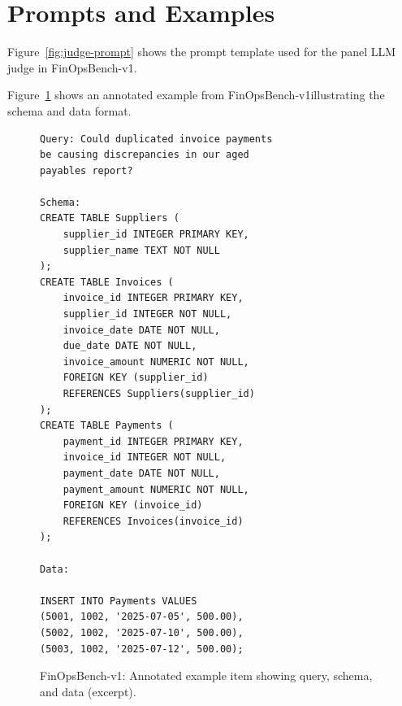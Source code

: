 \documentclass[11pt]{article}
\newcommand{\synthsubset}{FinOpsBench-v1}\xspace
\begin{document}
\section{Prompts and Examples}
\label{app:prompts}

Figure~\ref{fig:judge-prompt} shows the prompt template used for the 
panel
LLM judge in \synthsubset.

Figure~\ref{fig:example-item} shows an annotated example from \synthsubset illustrating the schema and data format.

\begin{figure}[h]
\small\centering
\begin{verbatim}
Query: Could duplicated invoice payments 
be causing discrepancies in our aged 
payables report?

Schema:
CREATE TABLE Suppliers (
    supplier_id INTEGER PRIMARY KEY,
    supplier_name TEXT NOT NULL
);
CREATE TABLE Invoices (
    invoice_id INTEGER PRIMARY KEY,
    supplier_id INTEGER NOT NULL,
    invoice_date DATE NOT NULL,
    due_date DATE NOT NULL,
    invoice_amount NUMERIC NOT NULL,
    FOREIGN KEY (supplier_id) 
    REFERENCES Suppliers(supplier_id)
);
CREATE TABLE Payments (
    payment_id INTEGER PRIMARY KEY,
    invoice_id INTEGER NOT NULL,
    payment_date DATE NOT NULL,
    payment_amount NUMERIC NOT NULL,
    FOREIGN KEY (invoice_id) 
    REFERENCES Invoices(invoice_id)
);

Data:

INSERT INTO Payments VALUES
(5001, 1002, '2025-07-05', 500.00),
(5002, 1002, '2025-07-10', 500.00),
(5003, 1002, '2025-07-12', 500.00);
\end{verbatim}
\caption{\synthsubset: Annotated example item showing query, schema, and data (excerpt).}
\label{fig:example-item}
\end{figure}
\end{document}
